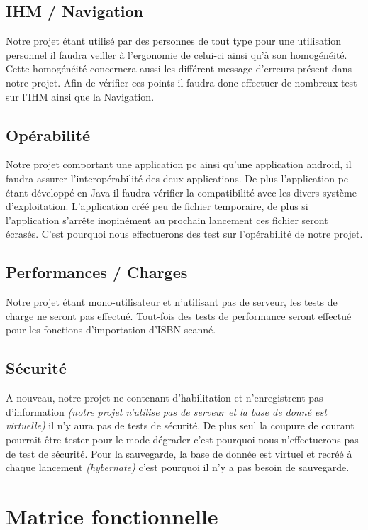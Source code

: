 \documentclass[]{../support-iutrs} %
\begin{document}
\subsection{IHM / Navigation}
Notre projet étant utilisé par des personnes de tout type pour une utilisation personnel il faudra veiller à l'ergonomie de celui-ci ainsi qu'à son homogénéité.
Cette homogénéité concernera aussi les différent message d'erreurs présent dans notre projet. 
Afin de vérifier ces points il faudra donc effectuer de nombreux test sur l'IHM ainsi que la Navigation.

\subsection{Opérabilité}
Notre projet comportant une application pc ainsi qu'une application android, il faudra assurer l'interopérabilité des deux applications. 
De plus l'application pc étant développé en Java il faudra vérifier la compatibilité avec les divers système d’exploitation.
L'application créé peu de fichier temporaire, de plus si l'application s’arrête inopinément au prochain lancement ces fichier seront écrasés.  
C'est pourquoi nous effectuerons des test sur l'opérabilité de notre projet.

\subsection{Performances  / Charges}
Notre projet étant mono-utilisateur et n'utilisant pas de serveur, les tests de charge ne seront pas effectué. 
Tout-fois des tests de performance seront effectué pour les fonctions d'importation d'ISBN scanné.

\subsection{Sécurité}
A nouveau, notre projet ne contenant d'habilitation et n'enregistrent pas d'information \textit{(notre projet n'utilise pas de serveur et la base de donné est virtuelle)} il n'y aura pas de tests de sécurité.
De plus seul la coupure de courant pourrait être tester pour le mode dégrader c'est pourquoi nous n'effectuerons pas de test de sécurité. 
Pour la sauvegarde, la base de donnée est virtuel et recréé à chaque lancement \textit{(hybernate)} c'est pourquoi il n'y a pas besoin de sauvegarde.  

\section{Matrice fonctionnelle} 
\end{document}
